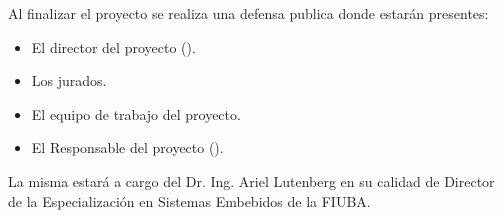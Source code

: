 \documentclass[
11pt, %
]{charter}
\begin{document}
Al finalizar el proyecto se realiza una defensa publica donde estarán presentes:

\begin{itemize}
	\item El director del proyecto (\directortittle \supname).
	\item Los jurados.
	\item El equipo de trabajo del proyecto.
	\item El Responsable del proyecto (\authortittle \authorname).
\end{itemize}

La misma estará a cargo del Dr. Ing. Ariel Lutenberg en su calidad de Director de la Especialización en Sistemas Embebidos de la FIUBA.
\end{document}
